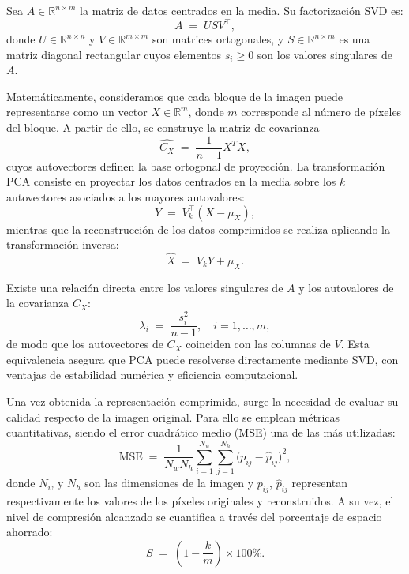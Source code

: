\documentclass[12pt]{article}
\begin{document}
Sea $A \in \mathbb{R}^{n \times m}$ la matriz de datos centrados en la media. Su factorización SVD es:
\begin{equation}
A \;=\; U S V^\top,
\label{eq:svd}
\end{equation}
donde $U \in \mathbb{R}^{n \times n}$ y $V \in \mathbb{R}^{m \times m}$ son matrices ortogonales, y $S \in \mathbb{R}^{n \times m}$ es una matriz diagonal rectangular cuyos elementos $s_i \geq 0$ son los valores singulares de $A$.

Matemáticamente, consideramos que cada bloque de la imagen puede representarse como un vector $X \in \mathbb{R}^{m}$, donde $m$ corresponde al número de píxeles del bloque. A partir de ello, se construye la matriz de covarianza
\begin{equation}
\widehat{C_X} \;=\; \frac{1}{n-1}X^TX ,
\label{eq:covarianza}
\end{equation}
cuyos autovectores definen la base ortogonal de proyección. La transformación PCA consiste en proyectar los datos centrados en la media sobre los $k$ autovectores asociados a los mayores autovalores:
\begin{equation}
Y \;=\; V_k^\top (X - \mu_X),
\label{eq:proyeccion}
\end{equation}
mientras que la reconstrucción de los datos comprimidos se realiza aplicando la transformación inversa:
\begin{equation}
\widehat{X} \;=\; V_k Y + \mu_X.
\label{eq:reconstruccion}
\end{equation}

\par\vspace{0.4cm}

Existe una relación directa entre los valores singulares de $A$ y los autovalores de la covarianza $C_X$: 
\begin{equation}
\lambda_i \;=\; \frac{s_i^2}{n-1}, \quad i=1,\dots,m,
\label{eq:relacion-svd}
\end{equation}
de modo que los autovectores de $C_X$ coinciden con las columnas de $V$. Esta equivalencia asegura que PCA puede resolverse directamente mediante SVD, con ventajas de estabilidad numérica y eficiencia computacional.

\par\vspace{0.4cm}
Una vez obtenida la representación comprimida, surge la necesidad de evaluar su calidad respecto de la imagen original. Para ello se emplean métricas cuantitativas, siendo el error cuadrático medio (MSE) una de las más utilizadas:
\begin{equation}
\mathrm{MSE} \;=\; \frac{1}{N_w N_h}\sum_{i=1}^{N_w}\sum_{j=1}^{N_h}\big(p_{ij}-\widehat{p}_{ij}\big)^2,
\label{eq:mse}
\end{equation}
donde $N_w$ y $N_h$ son las dimensiones de la imagen y $p_{ij}$, $\widehat{p}_{ij}$ representan respectivamente los valores de los píxeles originales y reconstruidos. A su vez, el nivel de compresión alcanzado se cuantifica a través del porcentaje de espacio ahorrado:
\begin{equation}
S \;=\; \left(1-\frac{k}{m}\right)\times 100\%.
\label{eq:ahorro}
\end{equation}
\end{document}
